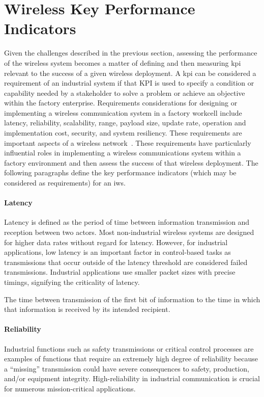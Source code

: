 \section{Wireless Key Performance Indicators}

Given the challenges described in the previous section, assessing the performance of the wireless system becomes a matter of defining and then measuring \gls{kpi} relevant to the success of a given wireless deployment.  A \gls{kpi} can be considered a requirement of an industrial system if that KPI is used to specify a condition or capability needed by a stakeholder to solve a problem or achieve an objective within the factory enterprise.  Requirements considerations for designing or implementing a wireless communication system in a factory workcell include latency, reliability, scalability, range, payload size, update rate, operation and implementation cost, security, and system resiliency. These requirements are important aspects of a wireless network~\cite{CandellRW2017}. These requirements have particularly influential roles in implementing a wireless communications system within a factory environment and then assess the success of that wireless deployment.  The following paragraphs define the key performance indicators (which may be considered as requirements) for an \gls{iws}. 

\paragraph{Latency}
Latency is defined as the period of time between information transmission and reception between two actors.  Most non-industrial wireless systems are designed for higher data rates without regard for latency. However, for industrial applications, low latency is an important factor in control-based tasks as transmissions that occur outside of the latency threshold are considered failed transmissions. Industrial applications use smaller packet sizes with precise timings, signifying the criticality of latency.
\begin{definition}[Latency] \label{def:latency}
	The time between transmission of the first bit of information to the time in which that information is received by its intended recipient.
\end{definition}

\paragraph{Reliability}
Industrial functions such as safety transmissions or critical control processes are examples of functions that require an extremely high degree of reliability because a “missing” transmission could have severe consequences to safety, production, and/or equipment integrity. High-reliability in industrial communication is crucial for numerous mission-critical applications. 

